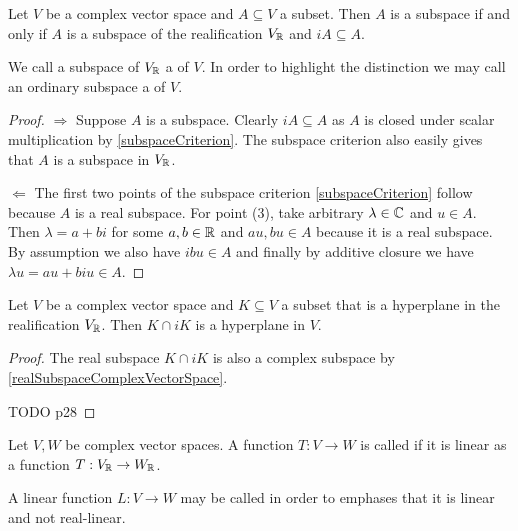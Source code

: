 \begin{lemma} \label{realSubspaceComplexVectorSpace}
Let $V$ be a complex vector space and $A\subseteq V$ a subset. Then $A$ is a subspace \textup{if and only if} $A$ is a subspace of the realification $V_{\mathbb{R}}$ and $iA \subseteq A$.
\end{lemma}
We call a subspace of $V_{\mathbb{R}}$ a  of $V$. In order to highlight the distinction we may call an ordinary subspace a  of $V$.
\begin{proof}
$\boxed{\Rightarrow}$ Suppose $A$ is a subspace. Clearly $iA \subseteq A$ as $A$ is closed under scalar multiplication by \ref{subspaceCriterion}. The subspace criterion also easily gives that $A$ is a subspace in $V_{\mathbb{R}}$.

$\boxed{\Leftarrow}$ The first two points of the subspace criterion \ref{subspaceCriterion} follow because $A$ is a real subspace. For point (3), take arbitrary $\lambda \in \mathbb{C}$ and $u\in A$. Then $\lambda = a+bi$ for some $a,b\in \mathbb{R}$ and $au,bu\in A$ because it is a real subspace. By assumption we also have $ibu\in A$ and finally by additive closure we have $\lambda u = au+biu \in A$.
\end{proof}

\begin{lemma} \label{realComplexHyperplane}
Let $V$ be a complex vector space and $K \subseteq V$ a subset that is a hyperplane in the realification $V_{\mathbb{R}}$. Then $K\cap iK$ is a hyperplane in $V$.
\end{lemma}
\begin{proof}
The real subspace $K\cap iK$ is also a complex subspace by \ref{realSubspaceComplexVectorSpace}.

TODO \cite{robertson_topological_1980} p28
\end{proof}

\begin{definition}
Let $V,W$ be complex vector spaces. A function $T: V\to W$ is called  if it is linear as a function $T: V_{\mathbb{R}} \to W_{\mathbb{R}}$.

A linear function $L: V\to W$ may be called  in order to emphases that it is linear and not real-linear.
\end{definition}

